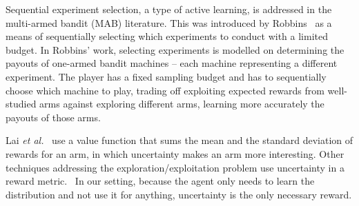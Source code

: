 Sequential experiment selection, a type of active learning, is addressed in the
multi-armed bandit (MAB) literature.  This was introduced by Robbins~\cite{robbins1952some} as a means of sequentially selecting which experiments
to conduct with a limited budget.  In Robbins' work,
selecting experiments is modelled on determining the payouts of one-armed
bandit machines -- each machine representing a different experiment.  The player
has a fixed sampling budget and has to sequentially choose which machine to
play, trading off exploiting expected rewards from well-studied arms against
exploring different arms, learning more accurately the payouts of those
arms.  

Lai \emph{et al.}~\cite{lai1985asymptotically} use a value function that sums the mean and the standard deviation of rewards for an arm, in which uncertainty makes an arm more interesting.  Other techniques addressing the exploration/exploitation problem use uncertainty in a reward metric.~\cite{burnetas1997optimal,auer2003using,balcan2006agnostic}  In our setting, because the agent only needs to learn the distribution and not use it for anything, uncertainty is the only necessary reward.

% 
% 
% 
% 
% 

